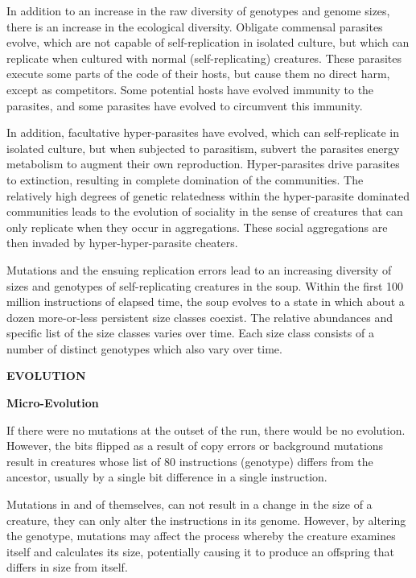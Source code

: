In addition to an increase in the raw diversity of genotypes and genome sizes,
there is an increase in the ecological diversity.  Obligate commensal
parasites evolve, which are not capable of self-replication in isolated
culture, but which can replicate when cultured with normal (self-replicating)
creatures.  These parasites execute some parts of the code of their hosts,
but cause them no direct harm, except as competitors.  Some potential hosts
have evolved immunity to the parasites, and some parasites have evolved to
circumvent this immunity.

In addition, facultative hyper-parasites have evolved, which can
self-replicate in isolated culture, but when subjected to parasitism, subvert
the parasites energy metabolism to augment their own reproduction.
Hyper-parasites drive parasites to extinction, resulting in complete
domination of the communities.  The relatively high degrees of genetic
relatedness within the hyper-parasite dominated communities leads to the
evolution of sociality in the sense of creatures that can only replicate
when they occur in aggregations.  These social aggregations are then invaded
by hyper-hyper-parasite cheaters.

Mutations and the ensuing replication errors lead to an increasing diversity
of sizes and genotypes of self-replicating creatures in the soup.  Within
the first 100 million instructions of elapsed time, the soup evolves to
a state in which about a dozen more-or-less persistent size classes coexist.
The relative abundances and specific list of the size classes varies over time.
Each size class consists of a number of distinct genotypes which also vary
over time.

\LP
\bf EVOLUTION\rm
\eLP

\LP
\bf Micro-Evolution\rm
\eLP

If there were no mutations at the outset of the run, there would be no
evolution.  However, the bits flipped as a result of copy errors or background
mutations result in creatures whose list of 80 instructions (genotype) differs
from the ancestor, usually by a single bit difference in a single instruction.

Mutations in and of themselves, can not result in a change in the size of
a creature, they can only alter the instructions in its genome.  However,
by altering the genotype, mutations may affect the process whereby the
creature examines itself and calculates its size, potentially causing it
to produce an offspring that differs in size from itself.

